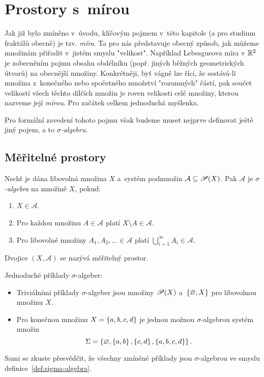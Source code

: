 \section{Prostory s~mírou}\label{sec:prostory-s-mirou}

Jak již bylo zmíněno v~úvodu, klíčovým pojmem v~této kapitole (a pro studium fraktálů obecně) je tzv. \emph{míra}. Ta pro nás představuje obecný způsob, jak můžeme množinám přiřadit v~jistém smyslu "velikost". Například Lebesgueova míra v $\mathbb{R}^2$ je zobecněním pojmu obsahu obdélníku (popř. jiných běžných geometrických útvarů) na obecnější množiny. Konkrétněji, byť vágně lze říci, že sestává-li množina z~konečného nebo spočetného množství "rozumných" částí, pak součet velikostí všech těchto dílčích množin je roven velikosti celé množiny, kterou nazveme její \emph{mírou}. Pro začátek celkem jednoduchá myšlenka.

Pro formální zavedení tohoto pojmu však budeme muset nejprve definovat ještě jiný pojem, a to \emph{$\sigma$-algebru}.

\subsection{Měřitelné prostory}\label{subsec:meritelne-prostory}

\begin{definition}\label{def:sigma-algebra}
    Nechť je dána libovolná množina $X$ a~systém podmnožin $\mathcal{A}\subseteq\mathscr{P}(X)$. Pak $\mathcal{A}$ je \emph{$\sigma$-algebra} na množině $X$, pokud:
    \begin{enumerate}[label=(\alph*)]
        \item\label{def:sigma-algebra-podm1} $X\in\mathcal{A}$.
        \item\label{def:sigma-algebra-podm2} Pro každou množinu $A\in\mathcal{A}$ platí $X\setminus A\in\mathcal{A}$.
        \item\label{def:sigma-algebra-podm3} Pro libovolné množiny $A_1,A_2,\ldots\in\mathcal{A}$ platí $\bigcup_{i=1}^\infty A_i\in\mathcal{A}$.
    \end{enumerate}
    Dvojice $(X,\mathcal{A})$ se nazývá měřitelný prostor.
\end{definition}

\begin{example}
    Jednoduché příklady $\sigma$-algeber:
    \begin{itemize}
        \item Triviálními příklady $\sigma$-algeber jsou množiny $\mathscr{P}(X)$ a~$\left\{\varnothing,X\right\}$ pro libovolnou množinu $X$.
        \item Pro konečnou množinu $X=\left\{a,b,c,d\right\}$ je jednou možnou $\sigma$-algebrou systém množin
        \[\Sigma=\left\{\varnothing,\left\{a,b\right\},\left\{c,d\right\},\left\{a,b,c,d\right\}\right\}.\]
    \end{itemize}
    Sami se zkuste přesvědčit, že všechny zmíněné příklady jsou $\sigma$-algebrou ve smyslu definice~\ref{def:sigma-algebra}.
\end{example}

